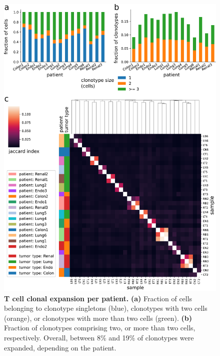 \documentclass{article}
\begin{document}
\newpage
\begin{figure}[!ht]
  \centering
  \includegraphics[width=7in]{../figures/clonal_expansion.pdf}
  \caption{\textbf{T cell clonal expansion per patient.} \textbf{(a)} Fraction of cells belonging to clonotype singletons (blue), clonotypes with two cells (orange), or clonotypes with more than two cells (green). \textbf{(b)} Fraction of clonotypes comprising two, or more than two cells, respectively. Overall, between 8\% and 19\% of clonotypes were expanded, depending on the patient.}
\end{figure}
\end{document}
